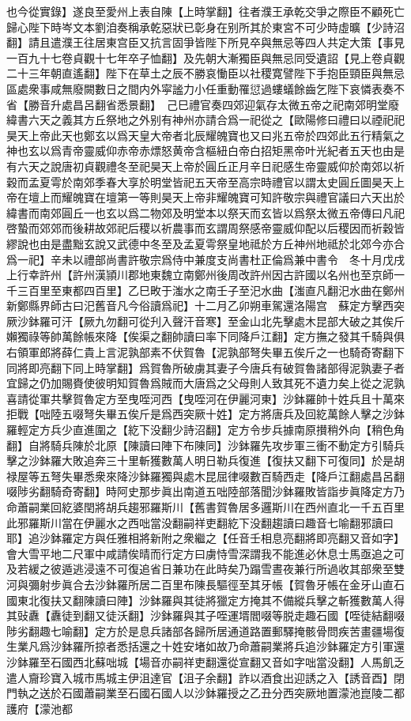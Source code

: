 也今從實錄】遂良至愛州上表自陳【上時掌翻】往者濮王承乾交爭之際臣不顧死亡歸心陛下時岑文本劉洎奏稱承乾惡狀已彰身在别所其於東宮不可少時虛曠【少詩沼翻】請且遣濮王往居東宫臣又抗言固爭皆陛下所見卒與無忌等四人共定大策【事見一百九十七卷貞觀十七年卒子恤翻】及先朝大漸獨臣與無忌同受遺詔【見上卷貞觀二十三年朝直遙翻】陛下在草土之辰不勝哀慟臣以社稷寛譬陛下手抱臣頸臣與無忌區處衆事咸無廢闕數日之間内外寜謐力小任重動罹愆過螻蟻餘齒乞陛下哀憐表奏不省【勝音升處昌呂翻省悉景翻】　己巳禮官奏四郊迎氣存太微五帝之祀南郊明堂廢緯書六天之義其方丘祭地之外别有神州亦請合爲一祀從之【歐陽修曰禮曰以禋祀祀昊天上帝此天也鄭玄以爲天皇大帝者北辰耀魄寶也又曰兆五帝於四郊此五行精氣之神也玄以爲青帝靈威仰赤帝赤熛怒黄帝含樞紐白帝白招矩黑帝叶光紀者五天也由是有六天之說唐初貞觀禮冬至祀昊天上帝於圓丘正月辛日祀感生帝靈威仰於南郊以祈穀而孟夏雩於南郊季春大享於明堂皆祀五天帝至高宗時禮官以謂太史圓丘圖昊天上帝在壇上而耀魄寶在壇第一等則昊天上帝非耀魄寶可知許敬宗與禮官議曰六天出於緯書而南郊圓丘一也玄以爲二物郊及明堂本以祭天而玄皆以爲祭太微五帝傳曰凡祀啓蟄而郊郊而後耕故郊祀后稷以祈農事而玄謂周祭感帝靈威仰配以后稷因而祈穀皆繆說也由是盡黜玄說又武德中冬至及孟夏雩祭皇地祗於方丘神州地祗於北郊今亦合爲一祀】辛未以禮部尚書許敬宗爲侍中兼度支尚書杜正倫爲兼中書令　冬十月戊戌上行幸許州【許州漢頴川郡地東魏立南鄭州後周改許州因古許國以名州也至京師一千三百里至東都四百里】乙巳畋于滍水之南壬子至汜水曲【滍直凡翻汜水曲在鄭州新鄭縣界師古曰汜舊音凡今俗讀爲祀】十二月乙卯朔車駕還洛陽宫　蘇定方擊西突厥沙鉢羅可汗【厥九勿翻可從刋入聲汗音寒】至金山北先擊處木昆部大破之其俟斤嬾獨祿等帥萬餘帳來降【俟渠之翻帥讀曰率下同降戶江翻】定方撫之發其千騎與俱右領軍郎將薛仁貴上言泥孰部素不伏賀魯【泥孰部弩失畢五俟斤之一也騎奇寄翻下同將即亮翻下同上時掌翻】爲賀魯所破虜其妻子今唐兵有破賀魯諸部得泥孰妻子者宜歸之仍加賜賚使彼明知賀魯爲賊而大唐爲之父母則人致其死不遺力矣上從之泥孰喜請從軍共擊賀魯定方至曳咥河西【曳咥河在伊麗河東】沙鉢羅帥十姓兵且十萬來拒戰【咄陸五啜弩失畢五俟斤是爲西突厥十姓】定方將唐兵及回紇萬餘人擊之沙鉢羅輕定方兵少直進圍之【紇下没翻少詩沼翻】定方令步兵據南原攅稍外向【稍色角翻】自將騎兵陳於北原【陳讀曰陣下布陳同】沙鉢羅先攻步軍三衝不動定方引騎兵擊之沙鉢羅大敗追奔三十里斬獲數萬人明日勒兵復進【復扶又翻下可復同】於是胡禄屋等五弩失畢悉衆來降沙鉢羅獨與處木昆屈律啜數百騎西走【降戶江翻處昌呂翻啜陟劣翻騎奇寄翻】時阿史那步眞出南道五咄陸部落聞沙鉢羅敗皆詣步眞降定方乃命蕭嗣業回紇婆閏將胡兵趨邪羅斯川【舊書賀魯居多邏斯川在西州直北一千五百里此邪羅斯川當在伊麗水之西咄當没翻嗣祥吏翻紇下没翻趨讀曰趣音七喻翻邪讀曰耶】追沙鉢羅定方與任雅相將新附之衆繼之【任音壬相息亮翻將即亮翻又音如字】會大雪平地二尺軍中咸請俟晴而行定方曰虜恃雪深謂我不能進必休息士馬亟追之可及若緩之彼遁逃浸遠不可復追省日兼功在此時矣乃蹋雪晝夜兼行所過收其部衆至雙河與彌射步眞合去沙鉢羅所居二百里布陳長驅徑至其牙帳【賀魯牙帳在金牙山直石國東北復扶又翻陳讀曰陣】沙鉢羅與其徒將獵定方掩其不備縱兵擊之斬獲數萬人得其䜴纛【纛徒到翻又徒沃翻】沙鉢羅與其子咥運壻閻啜等脱走趣石國【咥徒結翻啜陟劣翻趣七喻翻】定方於是息兵諸部各歸所居通道路置郵驛掩骸骨問疾苦畫疆場復生業凡爲沙鉢羅所掠者悉括還之十姓安堵如故乃命蕭嗣業將兵追沙鉢羅定方引軍還沙鉢羅至石國西北蘇咄城【場音亦嗣祥吏翻還從宣翻又音如字咄當没翻】人馬飢乏遣人齎珍寶入城市馬城主伊沮達官【沮子余翻】詐以酒食出迎誘之入【誘音酉】閉門執之送於石國蕭嗣業至石國石國人以沙鉢羅授之乙丑分西突厥地置濛池崑陵二都護府【濛池都